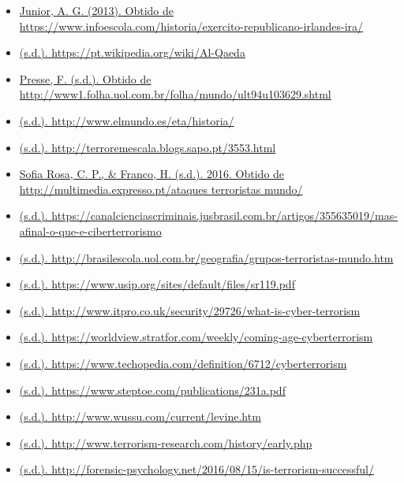 \documentclass{report}
\begin{document}
\begin{itemize}
 \item  \url {Junior, A. G. (2013).  Obtido de https://www.infoescola.com/historia/exercito-republicano-irlandes-ira/}
 \item  \url {(s.d.). https://pt.wikipedia.org/wiki/Al-Qaeda}
 \item  \url {Presse, F. (s.d.). Obtido de http://www1.folha.uol.com.br/folha/mundo/ult94u103629.shtml}
 \item  \url {(s.d.). http://www.elmundo.es/eta/historia/}
 \item  \url {(s.d.). http://terroremescala.blogs.sapo.pt/3553.html}
 \item  \url {Sofia Rosa, C. P., & Franco, H. (s.d.). 2016. Obtido de http://multimedia.expresso.pt/ataques terroristas mundo/}
 \item  \url {(s.d.). https://canalcienciascriminais.jusbrasil.com.br/artigos/355635019/mas-afinal-o-que-e-ciberterrorismo}
 \item  \url {(s.d.). http://brasilescola.uol.com.br/geografia/grupos-terroristas-mundo.htm}
 \item  \url {(s.d.). https://www.usip.org/sites/default/files/sr119.pdf}
 \item  \url {(s.d.). http://www.itpro.co.uk/security/29726/what-is-cyber-terrorism}
 \item  \url {(s.d.). https://worldview.stratfor.com/weekly/coming-age-cyberterrorism}
 \item  \url {(s.d.). https://www.techopedia.com/definition/6712/cyberterrorism}
 \item  \url {(s.d.). https://www.steptoe.com/publications/231a.pdf}
 \item  \url {(s.d.). http://www.wussu.com/current/levine.htm}
 \item  \url {(s.d.). http://www.terrorism-research.com/history/early.php}
 \item  \url {(s.d.). http://forensic-psychology.net/2016/08/15/is-terrorism-successful/}
\end {itemize}
\end{document}
